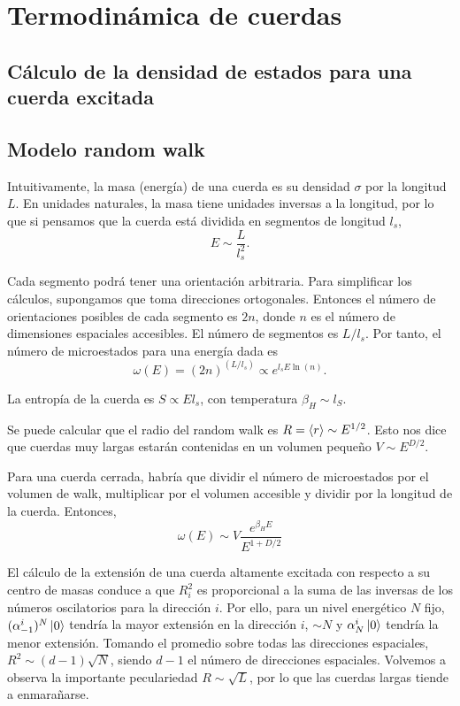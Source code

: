 \chapter{Termodinámica de cuerdas}

\section{Cálculo de la densidad de estados para una cuerda excitada}

\section{Modelo random walk}
Intuitivamente, la masa (energía) de una cuerda es su densidad $\sigma$ por la longitud $L$.
En unidades naturales, la masa tiene unidades inversas a la longitud, por lo que si pensamos
que la cuerda está dividida en segmentos de longitud $l_s$, 
\begin{equation}
  E\sim  \frac{L}{l_s^2}.
\end{equation}

Cada segmento podrá tener una orientación arbitraria. Para simplificar los cálculos,
supongamos que toma direcciones ortogonales. Entonces el número de orientaciones posibles
de cada segmento es $2n$, donde $n$ es el número de dimensiones espaciales accesibles.
El número de segmentos es $L/l_s$.
Por tanto, el número de microestados para una energía dada es
\begin{equation}
  \omega(E)=(2n)^{(L/l_s)}\propto e^{l_s E \ln (n)}.
\end{equation}

La entropía de la cuerda es $S\propto El_s$, con temperatura $\beta_H\sim l_S$.

Se puede calcular que el radio del random walk es $R=\expval{r}\sim E^{1/2}$. Esto
nos dice que cuerdas muy largas estarán contenidas en un volumen pequeño $V\sim E^{D/2}$.

Para una cuerda cerrada, habría que dividir el número de microestados por el 
volumen de walk, multiplicar por el volumen accesible y dividir por la longitud de la cuerda.
Entonces,
\begin{equation}
  \omega(E)\sim V \frac{e^{\beta_H E}}{E^{1+D/2}}
\end{equation}

El cálculo de la extensión de una cuerda altamente excitada con respecto a su centro de masas 
conduce a que $R^2_i$ es proporcional a la suma de las inversas de los números oscilatorios para
la dirección $i$.
Por ello, para un nivel energético $N$ fijo, $(\alpha^i_{-1})^N\ket{0}$ tendría la mayor extensión en la dirección $i$, $\sim N$ y
$\alpha^i_N\ket{0}$ tendría la menor extensión.
Tomando el promedio sobre todas las direcciones espaciales, $R^2\sim (d-1)\sqrt{N}$, siendo
$d-1$ el número de direcciones espaciales. Volvemos a  observa la importante peculariedad $R\sim \sqrt{L}$,
por lo que las cuerdas largas tiende a enmarañarse.

